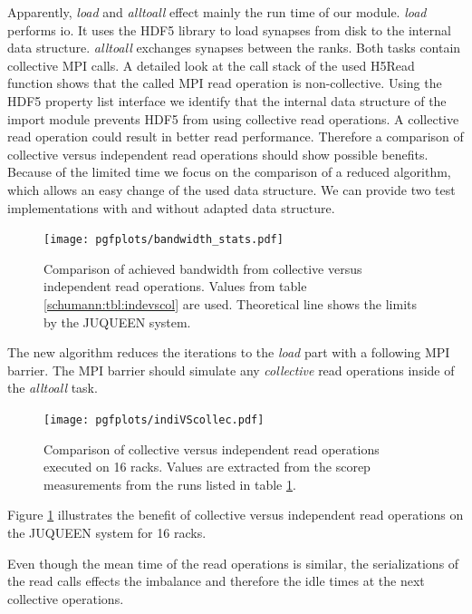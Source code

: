 Apparently, \emph{load} and \emph{alltoall} effect mainly the run time of our module.
\emph{load} performs io. It uses the HDF5 library to load synapses from disk to the internal data structure.
\emph{alltoall} exchanges synapses between the ranks. Both tasks contain collective MPI calls.
A detailed look at the call stack of the used H5Read function shows that the called MPI read operation is non-collective.
Using the HDF5 property list interface we identify that the internal data structure of the import module prevents HDF5 from using collective read operations.
A collective read operation could result in better read performance.
Therefore a comparison of collective versus independent read operations should show possible benefits.
Because of the limited time we focus on the comparison of a reduced algorithm,
which allows an easy change of the used data structure.
We can provide two test implementations with and without adapted data structure.
\begin{figure}[h!]
\begin{center}
 \texttt{[image: pgfplots/bandwidth\_stats.pdf]}
\end{center}
\caption{Comparison of achieved bandwidth from collective versus independent read operations.
 Values from table \ref{schumann:tbl:indevscol} are used. Theoretical line shows the limits by the
 JUQUEEN system.}
\end{figure}
The new algorithm reduces the iterations to the \emph{load} part with a following MPI barrier.
The MPI barrier should simulate any \emph{collective} read operations inside of the \emph{alltoall} task.
\begin{figure}[h!]
\begin{center}
 \texttt{[image: pgfplots/indiVScollec.pdf]}
\end{center}
\caption{Comparison of collective versus independent read operations executed on 16 racks.
 Values are extracted from the scorep measurements from the runs listed in table \ref{schumann:fig:indiVScollec}.}
 \label{schumann:fig:indiVScollec}
\end{figure}

Figure \ref{schumann:fig:indiVScollec} illustrates the benefit of collective versus independent read operations
on the JUQUEEN system for 16 racks.

Even though the mean time of the read operations is similar, the serializations of the read calls effects the
imbalance and therefore the idle times at the next collective operations. 

